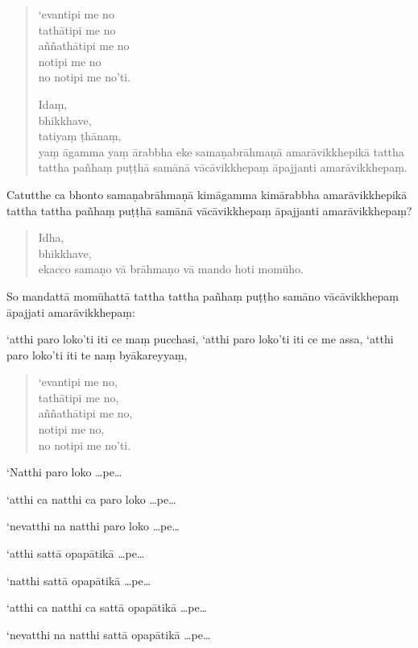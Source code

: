 \documentclass[11pt,twoside,openright]{book}
\begin{document}
\begin{verse}
‘evantipi me no\\
 tathātipi me no\\
 aññathātipi me no\\
 notipi me no\\
 no notipi me no’ti.

Idaṃ,\\
\vin  bhikkhave,\\
\vin  tatiyaṃ ṭhānaṃ,\\
\vin  yaṃ āgamma yaṃ ārabbha eke samaṇabrāhmaṇā amarāvikkhepikā tattha tattha pañhaṃ puṭṭhā samānā vācāvikkhepaṃ āpajjanti amarāvikkhepaṃ.

\end{verse}
\pstart
Catutthe ca bhonto samaṇabrāhmaṇā kimāgamma kimārabbha amarāvikkhepikā tattha tattha pañhaṃ puṭṭhā samānā vācāvikkhepaṃ āpajjanti amarāvikkhepaṃ?
\pend

\begin{verse}
Idha,\\
\vin  bhikkhave,\\
\vin  ekacco samaṇo vā brāhmaṇo vā mando hoti momūho.

\end{verse}
\pstart
So mandattā momūhattā tattha tattha pañhaṃ puṭṭho samāno vācāvikkhepaṃ āpajjati amarāvikkhepaṃ:
\pend

\pstart
‘atthi paro loko’ti iti ce maṃ pucchasi, ‘atthi paro loko’ti iti ce me assa, ‘atthi paro loko’ti iti te naṃ byākareyyaṃ,
\pend

\begin{verse}
‘evantipi me no,\\
\vin  tathātipi me no,\\
\vin  aññathātipi me no,\\
\vin  notipi me no,\\
\vin  no notipi me no’ti.

\end{verse}
\pstart
‘Natthi paro loko …pe…
\pend

\pstart
‘atthi ca natthi ca paro loko …pe…
\pend

\pstart
‘nevatthi na natthi paro loko …pe…
\pend

\pstart
‘atthi sattā opapātikā …pe…
\pend

\pstart
‘natthi sattā opapātikā …pe…
\pend

\pstart
‘atthi ca natthi ca sattā opapātikā …pe…
\pend

\pstart
‘nevatthi na natthi sattā opapātikā …pe…
\pend
\end{document}
